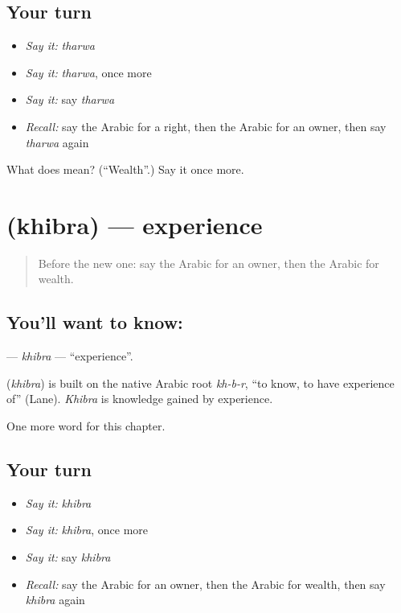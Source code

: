 \subsection*{Your turn}
\begin{itemize}
\raggedright
  \item \emph{Say it:} \emph{tharwa}
  \item \emph{Say it:} \emph{tharwa}, once more
  \item \emph{Say it:} say \emph{tharwa}
  \item \emph{Recall:} say the Arabic for a right, then the Arabic for an owner, then say \emph{tharwa} again
\end{itemize}

\begin{tcolorbox}[breakable,colback=teal!4,colframe=teal!35!black,title={Before you move on}]
What does  mean? (\textquotedblleft{}Wealth\textquotedblright{}.) Say it once more.
\end{tcolorbox}
\section[\texorpdfstring{\ar{خبرة} (khibra)}{خبرة (khibra)}]{ (khibra) — experience}

\label{lesson:AR-C109-khibra}



\begin{quote}
Before the new one: say the Arabic for an owner, then the Arabic for wealth.
\end{quote}

\subsection*{You'll want to know: }
\textbf{} — \emph{khibra} — \textquotedblleft{}experience\textquotedblright{}.

\begin{cousinweb}
\textbf{} (\emph{khibra}) is built on the native Arabic root \emph{kh-b-r}, \textquotedblleft{}to know, to have experience of\textquotedblright{} (Lane). \emph{Khibra} is knowledge gained by experience.
\end{cousinweb}

\begin{grammarlens}[title={What you've built}]
One more word for this chapter.
\end{grammarlens}

\subsection*{Your turn}
\begin{itemize}
\raggedright
  \item \emph{Say it:} \emph{khibra}
  \item \emph{Say it:} \emph{khibra}, once more
  \item \emph{Say it:} say \emph{khibra}
  \item \emph{Recall:} say the Arabic for an owner, then the Arabic for wealth, then say \emph{khibra} again
\end{itemize}

